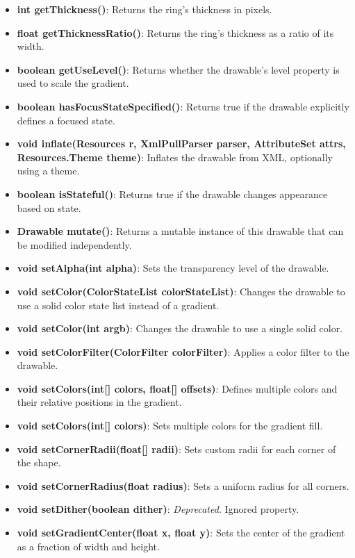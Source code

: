 \documentclass{report}
\begin{document}
\begin{itemize}
\begin{itemize}
            \item \textbf{int getThickness()}: Returns the ring’s thickness in pixels.
            \item \textbf{float getThicknessRatio()}: Returns the ring’s thickness as a ratio of its width.
            \item \textbf{boolean getUseLevel()}: Returns whether the drawable’s level property is used to scale the gradient.
            \item \textbf{boolean hasFocusStateSpecified()}: Returns true if the drawable explicitly defines a focused state.
            \item \textbf{void inflate(Resources r, XmlPullParser parser, AttributeSet attrs, Resources.Theme theme)}: Inflates the drawable from XML, optionally using a theme.
            \item \textbf{boolean isStateful()}: Returns true if the drawable changes appearance based on state.
            \item \textbf{Drawable mutate()}: Returns a mutable instance of this drawable that can be modified independently.
            \item \textbf{void setAlpha(int alpha)}: Sets the transparency level of the drawable.
            \item \textbf{void setColor(ColorStateList colorStateList)}: Changes the drawable to use a solid color state list instead of a gradient.
            \item \textbf{void setColor(int argb)}: Changes the drawable to use a single solid color.
            \item \textbf{void setColorFilter(ColorFilter colorFilter)}: Applies a color filter to the drawable.
            \item \textbf{void setColors(int[] colors, float[] offsets)}: Defines multiple colors and their relative positions in the gradient.
            \item \textbf{void setColors(int[] colors)}: Sets multiple colors for the gradient fill.
            \item \textbf{void setCornerRadii(float[] radii)}: Sets custom radii for each corner of the shape.
            \item \textbf{void setCornerRadius(float radius)}: Sets a uniform radius for all corners.
            \item \textbf{void setDither(boolean dither)}: \textit{Deprecated.} Ignored property.
            \item \textbf{void setGradientCenter(float x, float y)}: Sets the center of the gradient as a fraction of width and height.

\end{itemize}
\end{itemize}
\end{document}
